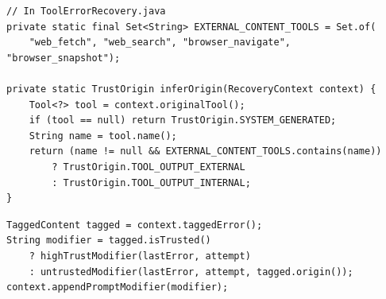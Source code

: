 \begin{lstlisting}[caption={Inferring content origin at the capture site (\code{ToolErrorRecovery.inferOrigin}).},label={lst:capture-site}]
// In ToolErrorRecovery.java
private static final Set<String> EXTERNAL_CONTENT_TOOLS = Set.of(
    "web_fetch", "web_search", "browser_navigate", "browser_snapshot");

private static TrustOrigin inferOrigin(RecoveryContext context) {
    Tool<?> tool = context.originalTool();
    if (tool == null) return TrustOrigin.SYSTEM_GENERATED;
    String name = tool.name();
    return (name != null && EXTERNAL_CONTENT_TOOLS.contains(name))
        ? TrustOrigin.TOOL_OUTPUT_EXTERNAL
        : TrustOrigin.TOOL_OUTPUT_INTERNAL;
}
\end{lstlisting}

\begin{lstlisting}[caption={\trustorigin{}-based template selection in \code{ReflectionInjectionRecovery}.},label={lst:trustorigin}]
TaggedContent tagged = context.taggedError();
String modifier = tagged.isTrusted()
    ? highTrustModifier(lastError, attempt)
    : untrustedModifier(lastError, attempt, tagged.origin());
context.appendPromptModifier(modifier);
\end{lstlisting}

